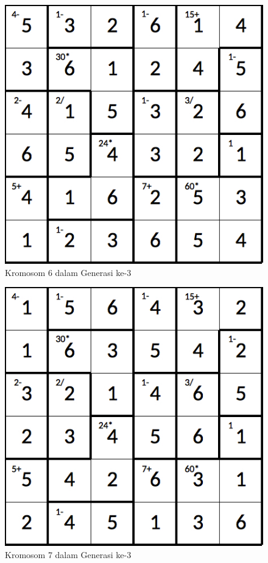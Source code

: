 \begin{figure}
\centering
\captionsetup{justification=centering}
\includegraphics[scale=0.333]{Gambar/hybridgenetic/Generation3Chromosome6}
\caption[Kromosom 6 dalam Generasi ke-3]{Kromosom 6 dalam Generasi ke-3}
\label{fig:analisisg3k6}
\end{figure}

\begin{figure}
\centering
\captionsetup{justification=centering}
\includegraphics[scale=0.333]{Gambar/hybridgenetic/Generation3Chromosome7}
\caption[Kromosom 7 dalam Generasi ke-3]{Kromosom 7 dalam Generasi ke-3}
\label{fig:analisisg3k7}
\end{figure}

